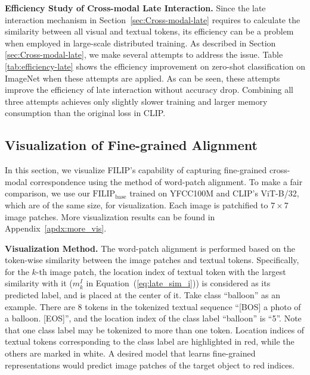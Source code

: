 \textbf{Efficiency Study of Cross-modal Late Interaction.}
\label{sec:efficiency-study-of-late-loss}
Since the late interaction mechanism in Section~\ref{sec:Cross-modal-late} requires to calculate the similarity between all visual and textual tokens, 
its efficiency can be a problem when
employed in large-scale distributed training.
As described in Section \ref{sec:Cross-modal-late}, we make several attempts to address the issue. 
Table \ref{tab:efficiency-late} shows the efficiency improvement on zero-shot classification on ImageNet when
these attempts are applied. 
As can be seen, these attempts improve the efficiency of late interaction  
without accuracy drop. Combining all three attempts achieves only slightly slower training and larger memory consumption than the original loss in CLIP.


\vspace{-1mm}
\subsection{Visualization of Fine-grained Alignment}
\label{sec:Visualization of Fine-grained Alignment}

In this section, we visualize FILIP's capability of capturing fine-grained cross-modal correspondence using the method of word-patch alignment. To make a fair comparison, we use our $\text{FILIP}_{\text{base}}$ trained on YFCC100M and CLIP's ViT-B/32, which are of the same size, for visualization. Each image is patchified to $7\times 7$ image patches. 
More visualization results can be found in Appendix~\ref{apdx:more_vis}.

\textbf{Visualization Method.} The word-patch alignment is performed based on the token-wise similarity between the image patches and textual tokens. Specifically, for the $k$-th image patch, the location index of textual token   with the largest similarity with it ($m_k^I$ in Equation~(\ref{eq:late_sim_i})) is considered as its predicted label, and is placed at the center of it.
Take class ``balloon'' as an example. 
There are 8 tokens in the tokenized textual sequence ``[BOS] a photo of a balloon. [EOS]'', 
and the location index of the class label ``balloon'' is ``5''. 
Note that one class label may be tokenized to more than one token.
Location indices of textual tokens corresponding to the class label are highlighted in red, while the others are marked in white.
A desired model that learns fine-grained representations  would predict  image patches of the target object to red indices.

